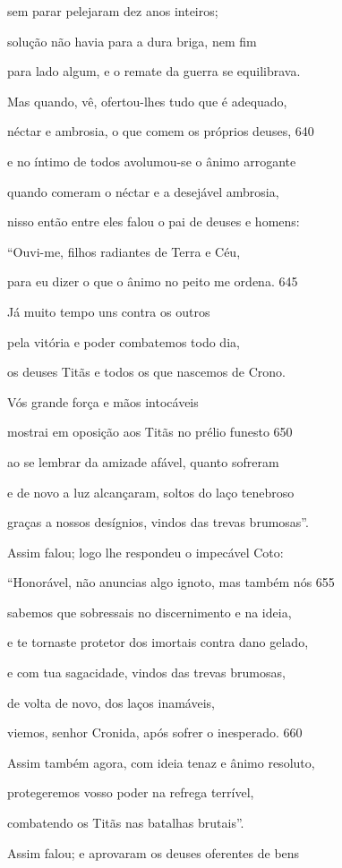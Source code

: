 sem parar pelejaram dez anos inteiros;

solução não havia para a dura briga, nem fim

para lado algum, e o remate da guerra se equilibrava.

\quad{}Mas quando, vê, ofertou-lhes tudo que é adequado,

néctar e ambrosia, o que comem os próprios deuses, \num{640}

e no íntimo de todos avolumou-se o ânimo arrogante

quando comeram o néctar e a desejável ambrosia,

nisso então entre eles falou o pai de deuses e homens:

``Ouvi-me, filhos radiantes de Terra e Céu,

para eu dizer o que o ânimo no peito me ordena. \num{645}

Já muito tempo uns contra os outros

pela vitória e poder combatemos todo dia,

os deuses Titãs e todos os que nascemos de Crono.

Vós grande força e mãos intocáveis

mostrai em oposição aos Titãs no prélio funesto \num{650}

ao se lembrar da amizade afável, quanto sofreram

e de novo a luz alcançaram, soltos do laço tenebroso

graças a nossos desígnios, vindos das trevas brumosas''.

\quad{}Assim falou; logo lhe respondeu o impecável Coto:

``Honorável, não anuncias algo ignoto, mas também nós \num{655}

sabemos que sobressais no discernimento e na ideia,

e te tornaste protetor dos imortais contra dano gelado,

e com tua sagacidade, vindos das trevas brumosas,

de volta de novo, dos laços inamáveis,

viemos, senhor Cronida, após sofrer o inesperado. \num{660}

Assim também agora, com ideia tenaz e ânimo resoluto,

protegeremos vosso poder na refrega terrível,

combatendo os Titãs nas batalhas brutais''.

Assim falou; e aprovaram os deuses oferentes de bens

